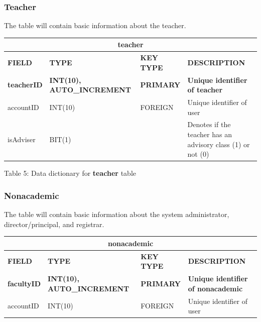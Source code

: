 \documentclass[11pt,a4paper,titlepage]{article}
\begin{document}
\subsubsection{Teacher}

The table will contain basic information about the teacher.

\vspace{1cm}
\begin{longtable}{ |p{2.5cm}|p{4.5cm}|p{2.5cm}|p{3cm}|  }
    \hline
    \multicolumn{4}{|c|}{\textbf{teacher}} \\
    \hline
    \textbf{FIELD}&\textbf{TYPE}&\textbf{KEY TYPE}&\textbf{DESCRIPTION}\\
    \hline
    \textbf{teacherID}   & \textbf{INT(10), AUTO\_INCREMENT}  & \textbf{PRIMARY} & \textbf{Unique identifier of teacher}\\ \hline
    accountID& INT(10) & FOREIGN & Unique identifier of user \\ \hline
    isAdviser& BIT(1) & & Denotes if the teacher has an advisory class (1) or not (0) \\ \hline
\end{longtable}

\vspace{.5cm}
\begin{center}
    Table 5: Data dictionary for \textbf{teacher} table
\end{center}


\subsubsection{Nonacademic}

The table will contain basic information about the system administrator, director/principal, and registrar.

\vspace{1cm}
\begin{longtable}{ |p{2.5cm}|p{4.5cm}|p{2.5cm}|p{3cm}|  }
    \hline
    \multicolumn{4}{|c|}{\textbf{nonacademic}} \\
    \hline
    \textbf{FIELD}&\textbf{TYPE}&\textbf{KEY TYPE}&\textbf{DESCRIPTION}\\
    \hline
    \textbf{facultyID}   & \textbf{INT(10), AUTO\_INCREMENT}  & \textbf{PRIMARY} & \textbf{Unique identifier of nonacademic}\\ \hline
    accountID& INT(10) & FOREIGN & Unique identifier of user \\ \hline
\end{longtable}
\end{document}
